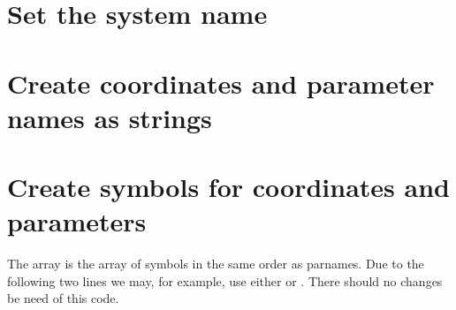 \documentclass[letterpaper,10pt,english]{jupyterBook}
\begin{document}
\section{Set the system name}
\label{\detokenize{CO-oxidationGenSym:set-the-system-name}}
\begin{sphinxVerbatim}[commandchars=\\\{\}]
\end{sphinxVerbatim}


\section{Create coordinates and parameter names as strings}
\label{\detokenize{CO-oxidationGenSym:create-coordinates-and-parameter-names-as-strings}}
\begin{sphinxVerbatim}[commandchars=\\\{\}]
\end{sphinxVerbatim}


\section{Create symbols for coordinates and parameters}
\label{\detokenize{CO-oxidationGenSym:create-symbols-for-coordinates-and-parameters}}
\sphinxAtStartPar
The array  is the array of symbols in the same order as parnames.
Due to the following two lines we may, for example, use either  or
. There should no changes be need of this code.
\end{document}
